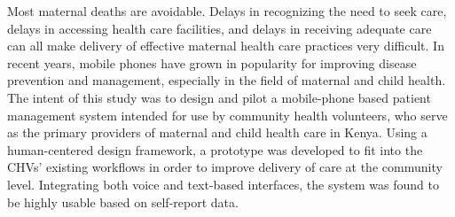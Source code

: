 \abstract

Most maternal deaths are avoidable. Delays in recognizing the need to seek care, delays in accessing  health care facilities, and delays in receiving adequate care can all make delivery of effective maternal health care practices very difficult. In recent years, mobile phones have grown in popularity for improving disease prevention and management, especially in the field of maternal and child health. The intent of this study was to design and pilot a mobile-phone based patient management system intended for use by community health volunteers, who serve as the primary providers of maternal and child health care in Kenya. Using a human-centered design framework, a prototype was developed to fit into the CHVs' existing workflows in order to improve delivery of care at the community level. Integrating both voice and text-based interfaces, the system was found to be highly usable based on self-report data.
